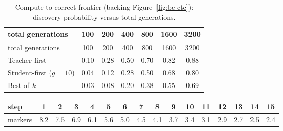 \begin{longtable}{lcccccc}
\caption{Compute-to-correct frontier (backing Figure~\ref{fig:bc-ctc}): discovery probability versus total generations.}\\
\toprule
total generations & 100 & 200 & 400 & 800 & 1600 & 3200 \\
\midrule
\endfirsthead
\toprule
total generations & 100 & 200 & 400 & 800 & 1600 & 3200 \\
\midrule
\endhead
\bottomrule
\endfoot
Teacher-first & 0.10 & 0.28 & 0.50 & 0.70 & 0.82 & 0.88 \\
Student-first ($g{=}10$) & 0.04 & 0.12 & 0.28 & 0.50 & 0.68 & 0.80 \\
Best-of-$k$ & 0.03 & 0.08 & 0.20 & 0.38 & 0.55 & 0.69 \\
\end{longtable}



\begin{center}\footnotesize\setlength{\tabcolsep}{3pt}
\begin{tabular}{lccccccccccccccc}
\toprule
step & 1 & 2 & 3 & 4 & 5 & 6 & 7 & 8 & 9 & 10 & 11 & 12 & 13 & 14 & 15 \\
\midrule
markers & 8.2 & 7.5 & 6.9 & 6.1 & 5.6 & 5.0 & 4.5 & 4.1 & 3.7 & 3.4 & 3.1 & 2.9 & 2.7 & 2.5 & 2.4 \\
\bottomrule
\end{tabular}\par\end{center}

